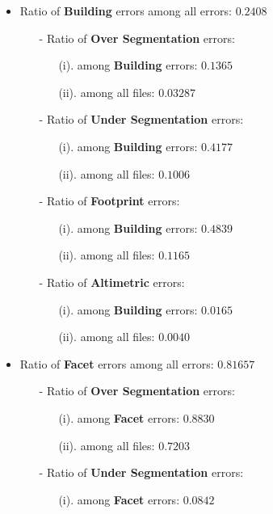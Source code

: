 \documentclass[a4paper, 11pt]{article}
\begin{document}
	\begin{itemize}
		\item Ratio of \textbf{Building} errors among all errors: $0.2408$
		\begin{itemize}
			\item[-] Ratio of \textbf{Over Segmentation} errors:
			\begin{itemize}
				\item[(i).] among \textbf{Building} errors:  $0.1365$
				\item[(ii).] among all files:  $0.03287$
			\end{itemize}
			\item[-] Ratio of \textbf{Under Segmentation} errors:
			\begin{itemize}
				\item[(i).] among \textbf{Building} errors:  $0.4177$
				\item[(ii).] among all files:   $0.1006$
			\end{itemize}
			\item[-] Ratio of \textbf{Footprint} errors:
			\begin{itemize}
				\item[(i).] among \textbf{Building} errors:  $0.4839$
				\item[(ii).] among all files:  $0.1165$
			\end{itemize}
			\item[-] Ratio of \textbf{Altimetric} errors:
			\begin{itemize}
				\item[(i).] among \textbf{Building} errors:  $0.0165$
				\item[(ii).] among all files:  $0.0040$
			\end{itemize}
		\end{itemize}
		\item Ratio of \textbf{Facet} errors among all errors: $0.81657$
		\begin{itemize}
			\item[-] Ratio of \textbf{Over Segmentation} errors:
			\begin{itemize}
				\item[(i).] among \textbf{Facet} errors:  $0.8830$
				\item[(ii).] among all files:  $0.7203$
			\end{itemize}
			\item[-] Ratio of \textbf{Under Segmentation} errors:
			\begin{itemize}
				\item[(i).] among \textbf{Facet} errors:  $0.0842$

\end{itemize}
\end{itemize}
\end{itemize}
\end{document}
